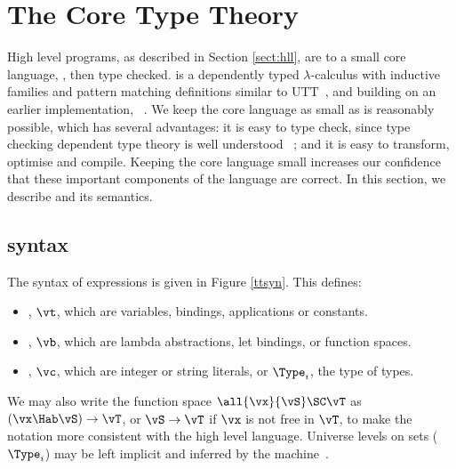 \section{The Core Type Theory}

High level \Idris{} programs, as described in Section \ref{sect:hll}, are 
 to a small core language, \TT{}, then type checked. 
\TT{} is a dependently typed $\lambda$-calculus with inductive families
and pattern matching definitions similar to UTT~\cite{luo1994}, and building
on an earlier implementation, \Ivor{}~\cite{Brady2006b}.
We keep the
core language as small as is reasonably possible, which has several advantages: it is
easy to type check, since type checking dependent type theory is well understood
~\cite{loh2010tutorial}; and it is easy to transform, optimise and compile. Keeping
the core language small increases our confidence that these important components of
the language are correct. In this section, we describe \TT{} and
its semantics.

\subsection{\TT{} syntax}

The syntax of \TT{} expressions is given in Figure \ref{ttsyn}. This defines:

\begin{itemize}
\item {}, $\vt$, which are variables, bindings, applications or constants.
\item {}, $\vb$, which are lambda abstractions, let bindings, or function spaces.
\item {}, $\vc$, which are integer or string literals, or $\Type_i$, the
type of types.
\end{itemize}

We may also write the function space $\all{\vx}{\vS}\SC\vT$ as $(\vx\Hab\vS)\to\vT$,
or $\vS\to\vT$ if $\vx$ is not free in $\vT$, to make the notation more consistent with
the high level language. Universe levels on sets ($\Type_i$) may be left implicit and
inferred by the machine~\cite{pollack1990implicit}.

